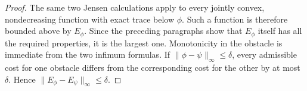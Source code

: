 \begin{proof}
The same two Jensen calculations apply to every jointly convex,
nondecreasing function with exact trace below \(\phi\).  Such a function is
therefore bounded above by \(E_\phi\).  Since the preceding paragraphs show
that \(E_\phi\) itself has all the required properties, it is the largest
one.  Monotonicity in the obstacle is immediate from the two infimum
formulas.  If \(\lVert\phi-\psi\rVert_\infty\leq\delta\), every admissible
cost for one obstacle differs from the corresponding cost for the other by
at most \(\delta\).  Hence
\(\lVert E_\phi-E_\psi\rVert_\infty\leq\delta\).
\end{proof}
